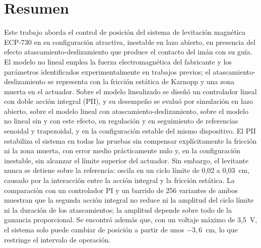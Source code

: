 \chapter*{Resumen}\label{Chap:Resumen}

Este trabajo aborda el control de posición del sistema de levitación magnética ECP-730 en su configuración atractiva, inestable en lazo abierto, en presencia del efecto atascamiento-deslizamiento que produce el contacto del imán con su guía. El modelo no lineal emplea la fuerza electromagnética del fabricante y los parámetros identificados experimentalmente en trabajos previos; el atascamiento-deslizamiento se representa con la fricción estática de Karnopp y una zona muerta en el actuador. Sobre el modelo linealizado se diseñó un controlador lineal con doble acción integral (PII), y su desempeño se evaluó por simulación en lazo abierto, sobre el modelo lineal con atascamiento-deslizamiento, sobre el modelo no lineal sin y con este efecto, en regulación y en seguimiento de referencias senoidal y trapezoidal, y en la configuración estable del mismo dispositivo. El PII estabiliza el sistema en todas las pruebas sin compensar explícitamente la fricción ni la zona muerta, con error medio prácticamente nulo y, en la configuración inestable, sin alcanzar el límite superior del actuador. Sin embargo, el levitante nunca se detiene sobre la referencia: oscila en un ciclo límite de 0,02 a 0,03~cm, causado por la interacción entre la acción integral y la fricción estática. La comparación con un controlador PI y un barrido de 256 variantes de ambos muestran que la segunda acción integral no reduce ni la amplitud del ciclo límite ni la duración de los atascamientos; la amplitud depende sobre todo de la ganancia proporcional. Se encontró además que, con un voltaje máximo de 3,5~V, el sistema solo puede cambiar de posición a partir de unos $-3{,}6$~cm, lo que restringe el intervalo de operación.
